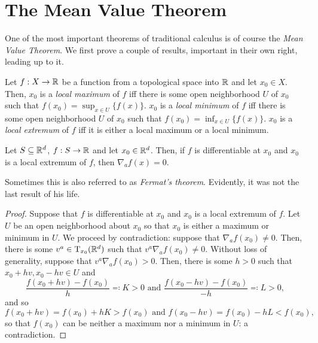 \section{The Mean Value Theorem}

One of the most important theorems of traditional calculus is of course the \emph{Mean Value Theorem}.  We first prove a couple of results, important in their own right, leading up to it.
\begin{dfn}\label{LocalExtrema}
Let $f:X\rightarrow \mathbb{R}$ be a function from a topological space into $\mathbb{R}$ and let $x_0\in X$.  Then, $x_0$ is a \emph{local maximum} of $f$ iff there is some open neighborhood $U$ of $x_0$ such that $f(x_0)=\sup _{x\in U}\{ f(x)\}$.  $x_0$ is a \emph{local minimum} of $f$ iff there is some open neighborhood $U$ of $x_0$ such that $f(x_0)=\inf _{x\in U}\{ f(x)\}$.  $x_0$ is a \emph{local extremum} of $f$ iff it is either a local maximum or a local minimum.
\end{dfn}
\begin{prp}\label{FirstDerivativeTest}
Let $S\subseteq \mathbb{R} ^d$, $f:S\rightarrow \mathbb{R}$ and let $x_0\in \mathbb{R} ^d$.  Then, if $f$ is differentiable at $x_0$ and $x_0$ is a local extremum of $f$, then $\nabla _af(x)=0$.
\begin{rmk}
Sometimes this is also referred to as \emph{Fermat's theorem}.  Evidently, it was not the last result of his life.
\end{rmk}
\begin{proof}
Suppose that $f$ is differentiable at $x_0$ and $x_0$ is a local extremum of $f$.  Let $U$ be an open neighborhood about $x_0$ so that $x_0$ is either a maximum or minimum in $U$.  We proceed by contradiction:  suppose that $\nabla _af(x_0)\neq 0$.  Then, there is some $v^a\in \tangent[\R ^d][x_0]$ such that $v^a\nabla _af(x_0)\neq 0$.  Without loss of generality, suppose that $v^a\nabla _af(x_0)>0$.  Then, there is some $h>0$ such that $x_0+hv,x_0-hv\in U$ and
\begin{equation}
\frac{f(x_0+hv)-f(x_0)}{h}\eqqcolon K>0\text{ and }\frac{f(x_0-hv)-f(x_0)}{-h}\eqqcolon L>0,
\end{equation}
and so
\begin{equation}
f(x_0+hv)=f(x_0)+hK>f(x_0)\text{ and }f(x_0-hv)=f(x_0)-hL<f(x_0),
\end{equation}
so that $f(x_0)$ can be neither a maximum nor a minimum in $U$:  a contradiction.
\end{proof}
\end{prp}

